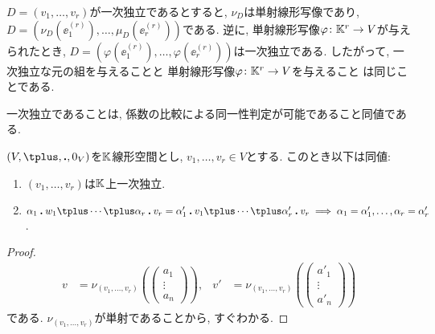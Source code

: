 \begin{remark}
  $D=(v_1,\ldots,v_r)$が一次独立であるとすると,
  $\nu_D$は単射線形写像であり,
  $D=(\nu_D(\ee^{(r)}_1),\ldots,\mu_D(\ee^{(r)}_r))$である.
  逆に, 単射線形写像$\varphi\colon \mathbb{K}^r\to V$が与えられたとき,
  $D=(\varphi(\ee^{(r)}_1),\ldots,\varphi(\ee^{(r)}_r))$は一次独立である.
  したがって,
  一次独立な元の組を与えることと
  単射線形写像$\varphi\colon \mathbb{K}^r\to V$を与えること
  は同じことである.
\end{remark}

一次独立であることは,
係数の比較による同一性判定が可能であること同値である.

\begin{prop}
  $(V,\plus,\act,0_V)$を$\mathbb{K}$線形空間とし,
  $v_1,\ldots,v_r\in V$とする.
  このとき以下は同値:
  \begin{enumerate}
  \item
    \label{prop:linindep:coef:item:1}
  $(v_1,\ldots,v_r)$は$\mathbb{K}$上一次独立.
  \item
      \label{prop:linindep:coef:item:2}
  $\alpha_1\act w_1\plus\cdots\plus \alpha_r\act v_r=\alpha'_1\act v_1\plus\cdots\plus \alpha'_r\act v_r \implies \alpha_1=\alpha'_1,\ldots,\alpha_r=\alpha'_r$.
  \end{enumerate}
\end{prop}
\begin{proof}
\begin{align*}
v&=\nu_{(v_1,\ldots,v_r)}(\begin{pmatrix}a_1\\\vdots\\a_n\end{pmatrix}), &
v'&=\nu_{(v_1,\ldots,v_r)}(\begin{pmatrix}a'_1\\\vdots\\a'_n\end{pmatrix}) 
\end{align*}
である. $\nu_{(v_1,\ldots,v_r)}$が単射であることから, すぐわかる.
\end{proof}

